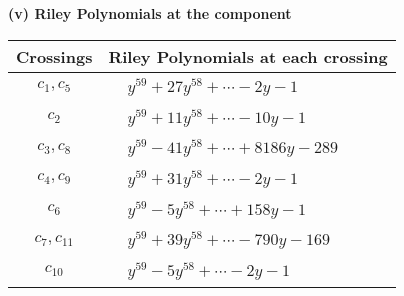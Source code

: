 \documentclass[1p]{elsarticle_modified}
\theoremstyle{definition}
\begin{document}
\newpage\renewcommand{\arraystretch}{1}
\flushleft \textbf{(v) Riley Polynomials at the component}\newline \\
\begin{tabular}{m{50pt}|m{274pt}}
Crossings & \hspace{64pt}Riley Polynomials at each crossing \\
\hline $$\begin{aligned}c_{1},c_{5}\end{aligned}$$&$\begin{aligned}
&y^{59}+27 y^{58}+\cdots-2 y-1
\end{aligned}$\\
\hline $$\begin{aligned}c_{2}\end{aligned}$$&$\begin{aligned}
&y^{59}+11 y^{58}+\cdots-10 y-1
\end{aligned}$\\
\hline $$\begin{aligned}c_{3},c_{8}\end{aligned}$$&$\begin{aligned}
&y^{59}-41 y^{58}+\cdots+8186 y-289
\end{aligned}$\\
\hline $$\begin{aligned}c_{4},c_{9}\end{aligned}$$&$\begin{aligned}
&y^{59}+31 y^{58}+\cdots-2 y-1
\end{aligned}$\\
\hline $$\begin{aligned}c_{6}\end{aligned}$$&$\begin{aligned}
&y^{59}-5 y^{58}+\cdots+158 y-1
\end{aligned}$\\
\hline $$\begin{aligned}c_{7},c_{11}\end{aligned}$$&$\begin{aligned}
&y^{59}+39 y^{58}+\cdots-790 y-169
\end{aligned}$\\
\hline $$\begin{aligned}c_{10}\end{aligned}$$&$\begin{aligned}
&y^{59}-5 y^{58}+\cdots-2 y-1
\end{aligned}$\\
\hline
\end{tabular}\\~\\
\end{document}

